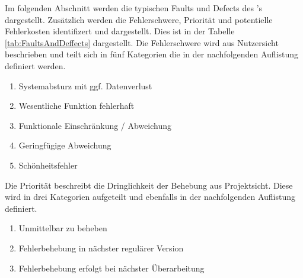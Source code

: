 Im folgenden Abschnitt werden die typischen Faults und Defects des 's dargestellt.
Zusätzlich werden die Fehlerschwere, Priorität und potentielle Fehlerkosten identifizert und dargestellt.
Dies ist in der Tabelle \ref{tab:FaultsAndDeffects} dargestellt.
Die Fehlerschwere wird aus Nutzersicht beschrieben und teilt sich in fünf Kategorien die in der nachfolgenden Auflistung definiert werden.
\begin{enumerate}
    \item Systemabsturz mit ggf. Datenverlust
    \item Wesentliche Funktion fehlerhaft
    \item Funktionale Einschränkung / Abweichung
    \item Geringfügige Abweichung
    \item Schönheitsfehler
\end{enumerate}
Die Priorität beschreibt die Dringlichkeit der Behebung aus Projektsicht.
Diese wird in drei Kategorien aufgeteilt und ebenfalls in der nachfolgenden Auflistung definiert.
\begin{enumerate}
    \item Unmittelbar zu beheben
    \item Fehlerbehebung in nächster regulärer Version
    \item Fehlerbehebung erfolgt bei nächster Überarbeitung
\end{enumerate}
